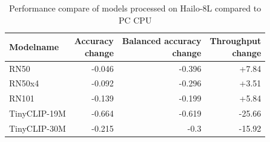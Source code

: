 \begin{table}[h!]
    \centering
    \begin{tabular}{l|rrr}
    \hline
    Modelname & \makecell{Accuracy\\change} &  \makecell{Balanced accuracy\\change}&\makecell{Throughput\\change}
    \\
    \hline
    RN50 & -0.046 & -0.396 &  +7.84\\
    RN50x4 & -0.092 & -0.296 &  +3.51\\
    RN101 & -0.139&  -0.199& +5.84\\  
    TinyCLIP-19M &-0.664 & -0.619 & -25.66\\ 
    TinyCLIP-30M &-0.215 & -0.3 & -15.92\\ 
    \end{tabular}
    \caption{Performance compare of models processed on Hailo-8L compared to PC CPU}
    \label{methods:tab:comparehailopc}
\end{table}